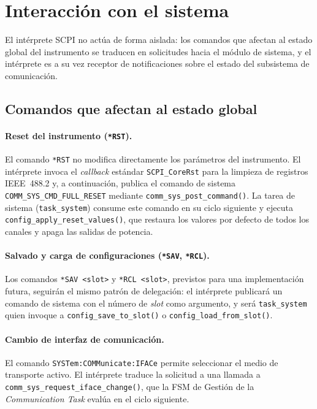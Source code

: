 \section{Interacción con el sistema}

El intérprete SCPI no actúa de forma aislada: los comandos que afectan al
estado global del instrumento se traducen en solicitudes hacia el módulo de
sistema, y el intérprete es a su vez receptor de notificaciones sobre el estado
del subsistema de comunicación.

\subsection{Comandos que afectan al estado global}

\paragraph{Reset del instrumento (\texttt{*RST}).}
El comando \texttt{*RST} no modifica directamente los parámetros del
instrumento. El intérprete invoca el \textit{callback} estándar
\texttt{SCPI\_CoreRst} para la limpieza de registros IEEE~488.2 y, a
continuación, publica el comando de sistema
\texttt{COMM\_SYS\_CMD\_FULL\_RESET} mediante
\texttt{comm\_sys\_post\_command()}. La tarea de sistema
(\texttt{task\_system}) consume este comando en su ciclo siguiente y ejecuta
\texttt{config\_apply\_reset\_values()}, que restaura los valores por defecto
de todos los canales y apaga las salidas de potencia.

\paragraph{Salvado y carga de configuraciones (\texttt{*SAV}, \texttt{*RCL}).}
Los comandos \texttt{*SAV <slot>} y \texttt{*RCL <slot>}, previstos para una
implementación futura, seguirán el mismo patrón de delegación: el intérprete
publicará un comando de sistema con el número de \textit{slot} como argumento, y
será \texttt{task\_system} quien invoque a \texttt{config\_save\_to\_slot()} o
\texttt{config\_load\_from\_slot()}.

\paragraph{Cambio de interfaz de comunicación.}
El comando \texttt{SYSTem:COMMunicate:IFACe} permite seleccionar el medio de
transporte activo. El intérprete traduce la solicitud a una llamada a
\texttt{comm\_sys\_request\_iface\_change()}, que la FSM de Gestión de la
\textit{Communication Task} evalúa en el ciclo siguiente.

